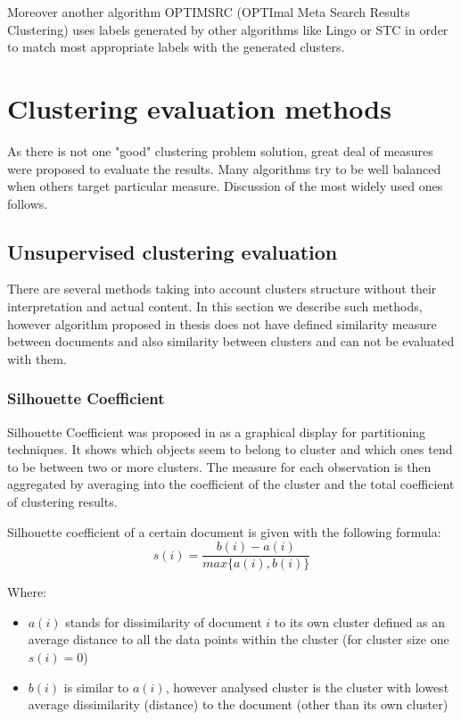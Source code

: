 \documentclass[a4paper, 12pt, oneside]{Thesis} %
\begin{document}
Moreover another algorithm OPTIMSRC (OPTImal Meta Search Results Clustering) \cite{carpineto2010optimal} uses labels generated by other algorithms like Lingo or STC in order to match most appropriate labels with the generated clusters.

\chapter{Clustering evaluation methods} As there is not one "good" clustering problem solution, great deal of measures were proposed to evaluate the results. Many algorithms try to be well balanced when others target particular measure. Discussion of the most widely used ones follows.

\section{Unsupervised clustering evaluation} There are several methods taking into account clusters structure without their interpretation and actual content. In this section we describe such methods, however algorithm proposed in thesis does not have defined similarity measure between documents and also similarity between clusters and can not be evaluated with them.

\subsection{Silhouette Coefficient} Silhouette Coefficient was proposed in \cite{rousseeuw1987silhouettes} as a graphical display for partitioning techniques. It shows which objects seem to belong to cluster and which ones tend to be between two or more clusters. The measure for each observation is then aggregated by averaging into the coefficient of the cluster and the total coefficient of clustering results.

Silhouette coefficient of a certain document is given with the following formula:
$$ s(i) = \frac{b(i) - a(i)}{max\{a(i), b(i)\}} $$

Where:
\begin{itemize}
\item $a(i)$ stands for dissimilarity of document $i$ to its own cluster defined as an average distance to all the data points within the cluster (for cluster size one $s(i) = 0$)
\item $b(i)$ is similar to $a(i)$, however analysed cluster is the cluster with lowest average dissimilarity (distance) to the document (other than its own cluster)
\end{itemize}
\end{document}
